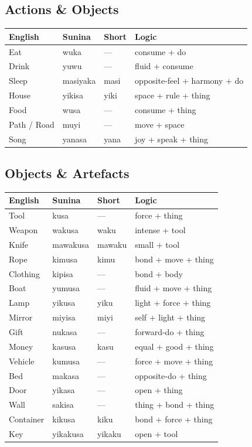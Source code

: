 \documentclass[12pt, a4paper]{article}
\begin{document}
\subsection{Actions \& Objects}
\begin{tabular}{@{}llll@{}}
\toprule
\textbf{English} & \textbf{Sunina} & \textbf{Short} & \textbf{Logic} \\ \midrule
Eat & wuka & --- & consume + do \\
Drink & yuwu & --- & fluid + consume \\
Sleep & masiyaka & masi & opposite-feel + harmony + do \\
House & yikisa & yiki & space + rule + thing \\
Food & wusa & --- & consume + thing \\
Path / Road & muyi & --- & move + space \\
Song & yanasa & yana & joy + speak + thing \\
\bottomrule
\end{tabular}

\subsection{Objects \& Artefacts}
\begin{tabular}{@{}llll@{}}
\toprule
\textbf{English} & \textbf{Sunina} & \textbf{Short} & \textbf{Logic} \\ \midrule
Tool & kusa & --- & force + thing \\
Weapon & wakusa & waku & intense + tool \\
Knife & mawakusa & mawaku & small + tool \\
Rope & kimusa & kimu & bond + move + thing \\
Clothing & kipisa & --- & bond + body \\
Boat & yumusa & --- & fluid + move + thing \\
Lamp & yikusa & yiku & light + force + thing \\
Mirror & miyisa & miyi & self + light + thing \\
Gift & nukasa & --- & forward-do + thing \\
Money & kasusa & kasu & equal + good + thing \\
Vehicle & kumusa & --- & force + move + thing \\
Bed & makasa & --- & opposite-do + thing \\
Door & yikasa & --- & open + thing \\
Wall & sakisa & --- & thing + bond + thing \\
Container & kikusa & kiku & bond + force + thing \\
Key & yikakusa & yikaku & open + tool \\
\bottomrule
\end{tabular}
\end{document}
